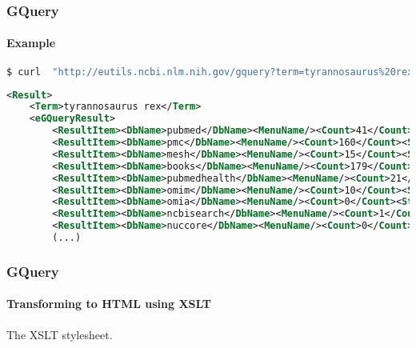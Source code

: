 \documentclass{beamer}
\begin{document}
\begin{frame}[fragile]
\frametitle{GQuery}
\framesubtitle{Example}
\begin{lstlisting}[language=bash,basicstyle=\tiny,breaklines=true,escapechar=\!]
$ curl  "http://eutils.ncbi.nlm.nih.gov/gquery?term=tyrannosaurus%20rex&retmode=xml"
\end{lstlisting}

\begin{lstlisting}[language=xml,basicstyle=\tiny,breaklines=true,escapechar=\%]
<Result>
    <Term>tyrannosaurus rex</Term>
    <eGQueryResult>
        <ResultItem><DbName>pubmed</DbName><MenuName/><Count>41</Count><Status>Ok</Status></ResultItem>
        <ResultItem><DbName>pmc</DbName><MenuName/><Count>160</Count><Status>Ok</Status></ResultItem>
        <ResultItem><DbName>mesh</DbName><MenuName/><Count>15</Count><Status>Ok</Status></ResultItem>
        <ResultItem><DbName>books</DbName><MenuName/><Count>179</Count><Status>Ok</Status></ResultItem>
        <ResultItem><DbName>pubmedhealth</DbName><MenuName/><Count>21</Count><Status>Ok</Status></ResultItem>
        <ResultItem><DbName>omim</DbName><MenuName/><Count>10</Count><Status>Ok</Status></ResultItem>
        <ResultItem><DbName>omia</DbName><MenuName/><Count>0</Count><Status>Term or Database is not found</Status></ResultItem>
        <ResultItem><DbName>ncbisearch</DbName><MenuName/><Count>1</Count><Status>Ok</Status></ResultItem>
        <ResultItem><DbName>nuccore</DbName><MenuName/><Count>0</Count><Status>Term or Database is not found</Status></ResultItem>
        (...)
\end{lstlisting}
\end{frame}


\begin{frame}[fragile]
\frametitle{GQuery}
\framesubtitle{Transforming to HTML using XSLT}
The XSLT stylesheet.

\end{frame}
\end{document}
